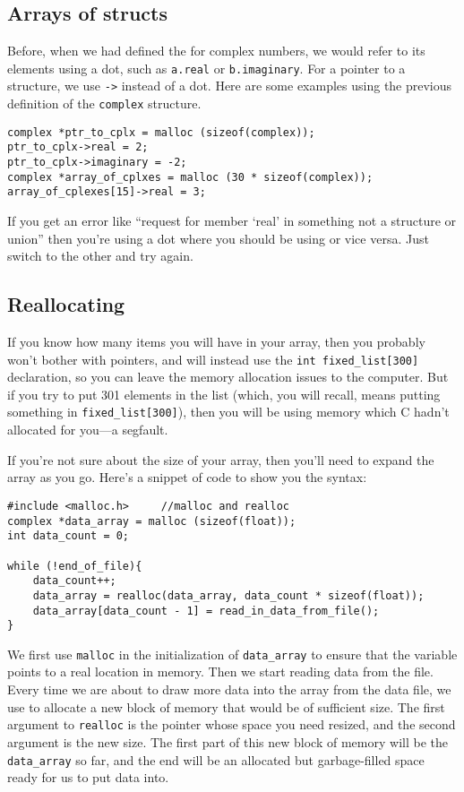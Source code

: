 \documentclass[12pt]{article}
\makeatletter
\def\ttind#1{\index{#1@{\tt #1}}{\tt #1}}
\makeatother
\begin{document}
\subsection{Arrays of structs}	
Before, when we had defined the \ttind{struct} for complex numbers, we would refer to its elements using a
dot, such as {\tt a.real} or {\tt b.imaginary}. For a pointer to a structure, we use {\tt ->} instead of 
a dot.  Here are some examples using the previous definition of the {\tt complex} structure.
\begin{verbatim}
complex *ptr_to_cplx = malloc (sizeof(complex));
ptr_to_cplx->real = 2;
ptr_to_cplx->imaginary = -2;
complex *array_of_cplxes = malloc (30 * sizeof(complex));
array_of_cplexes[15]->real = 3;
\end{verbatim}

If you get an error like ``request for member `real' in something not a structure or union'' then you're
using a dot where you should be using \ttind{->} or vice versa. Just switch to the other and try again.


\subsection{Reallocating} If you know how many items you will have
in your array, then you probably won't bother with pointers, and will
instead use the {\tt int fixed\_list[300]} declaration, so you can leave
the memory allocation issues to the computer. But if you try to put 301
elements in the list (which, you will recall, means putting something
in {\tt fixed\_list[300]}), then you will be using memory which C hadn't
allocated for you---a segfault.

If you're not sure about the size of your array, then you'll need to
expand the array as you go. Here's a snippet of code to show you the syntax:
\begin{verbatim}
#include <malloc.h>     //malloc and realloc
complex *data_array = malloc (sizeof(float));
int data_count = 0;

while (!end_of_file){
    data_count++;
    data_array = realloc(data_array, data_count * sizeof(float));
    data_array[data_count - 1] = read_in_data_from_file();
}
\end{verbatim}

We first use {\tt malloc} in the initialization of {\tt data\_array}
to ensure that the variable points to a real location in memory. Then
we start reading data from the file. Every time we are about to draw
more data into the array from the data file, we use \ttind{realloc} to
allocate a new block of memory that would be of sufficient size. The first
argument to {\tt realloc} is the pointer whose space you need resized,
and the second argument is the new size.  The first part of this new
block of memory will be the {\tt data\_array} so far, and the end will
be an allocated but garbage-filled space ready for us to put data into.
\end{document}
